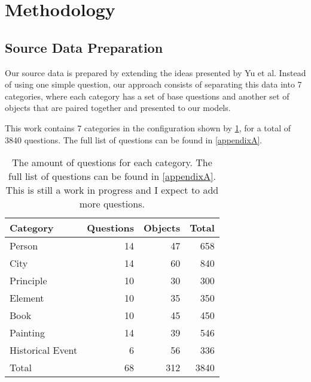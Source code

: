 \section{Methodology}

\newcommand{\param}{\ensuremath{p}}
\newcommand{\cparam}{\ensuremath{\overline{p}}}
\newcommand{\noctx}{\ensuremath{Q}}
\newcommand{\ctx}{\ensuremath{W}}
\newcommand{\NLL}{\text{NLL}}
\newcommand{\Perp}{\text{PPL}}

\newcommand{\cats}{7}
\newcommand{\baseqs}{68}
\newcommand{\things}{312}
\newcommand{\qs}{3840}

\subsection{Source Data Preparation}
\label{preparation}

Our source data is prepared by extending the ideas presented by Yu et al\cite{factual_recall}.
Instead of using one simple question, our approach consists of separating this data into \cats{} categories, where each category has a set of base questions and another set of objects that are paired together and presented to our models.

This work contains \cats{} categories in the configuration shown by \cref{categories_numbers}, for a total of \qs{} questions.
The full list of questions can be found in \cref{appendixA}.

\begin{table}[h]
	\centering
	\scriptsize
	\begin{tabular}{l | r r r}
		\toprule
			\bfseries Category & \bfseries Questions & \bfseries Objects & \bfseries Total \\
		\midrule
			Person           & 14 &  47 &  658 \\
			City             & 14 &  60 &  840 \\
			Principle        & 10 &  30 &  300 \\
			Element          & 10 &  35 &  350 \\
			Book             & 10 &  45 &  450 \\
			Painting         & 14 &  39 &  546 \\
			Historical Event & 6  &  56 &  336 \\
		\midrule
			Total & \baseqs{} & \things{} & \qs{} \\
		\bottomrule
	\end{tabular}
	\caption{The amount of questions for each category. The full list of questions can be found in \cref{appendixA}. This is still a work in progress and I expect to add more questions.}
	\label{categories_numbers}
\end{table}

